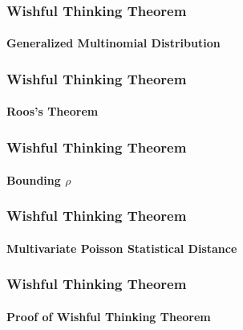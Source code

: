 \documentclass{beamer}
\begin{document}
\begin{frame}
  \frametitle{Wishful Thinking Theorem} \framesubtitle{Generalized
    Multinomial Distribution}
  
\end{frame}

\begin{frame}
  \frametitle{Wishful Thinking Theorem} \framesubtitle{Roos's Theorem}
  
\end{frame}


\begin{frame}
  \frametitle{Wishful Thinking Theorem} \framesubtitle{Bounding $\rho$}
  
\end{frame}


\begin{frame}
  \frametitle{Wishful Thinking Theorem} \framesubtitle{Multivariate
    Poisson Statistical Distance}  
\end{frame}

\begin{frame}
  \frametitle{Wishful Thinking Theorem} \framesubtitle{Proof of
    Wishful Thinking Theorem}  
\end{frame}
\end{document}
